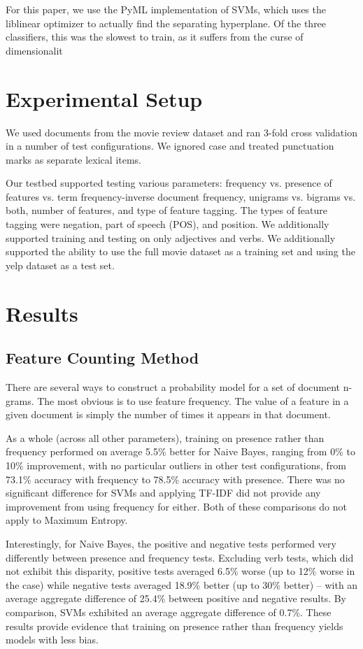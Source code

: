 \documentclass[10pt,twocolumn,letterpaper]{article}
\begin{document}
For this paper, we use the PyML implementation of SVMs, which uses the liblinear optimizer to actually find the separating hyperplane. Of the three classifiers, this was the slowest to train, as it suffers from the curse of dimensionalit

\section{Experimental Setup}
We used documents from the movie review dataset and ran 3-fold cross validation in a number of test configurations. We ignored case and treated punctuation marks as separate lexical items. 

Our testbed supported testing various parameters: frequency vs. presence of features vs. term frequency-inverse document frequency, unigrams vs. bigrams vs. both, number of features, and type of feature tagging. The types of feature tagging were negation, part of speech (POS), and position. We additionally supported training and testing on only adjectives and verbs. We additionally supported the ability to use the full movie dataset as a training set and using the yelp dataset as a test set.

\section{Results}
\subsection{Feature Counting Method}
There are several ways to construct a probability model for a set of document n-grams. The most obvious is to use feature frequency. The value of a feature in a given document is simply the number of times it appears in that document. 

As a whole (across all other parameters), training on presence rather than frequency performed on average 5.5\% better for Naive Bayes, ranging from 0\% to 10\% improvement, with no particular outliers in other test configurations, from 73.1\% accuracy with frequency to 78.5\% accuracy with presence. There was no significant difference for SVMs and applying TF-IDF did not provide any improvement from using frequency for either. Both of these comparisons do not apply to Maximum Entropy.

Interestingly, for Naive Bayes, the positive and negative tests performed very differently between presence and frequency tests. Excluding verb tests, which did not exhibit this disparity, positive tests averaged 6.5\% worse (up to 12\% worse in the case) while negative tests averaged 18.9\% better (up to 30\% better) -- with an average aggregate difference of 25.4\% between positive and negative results. By comparison, SVMs exhibited an average aggregate difference of 0.7\%. These results provide evidence that training on presence rather than frequency yields models with less bias.
\end{document}
